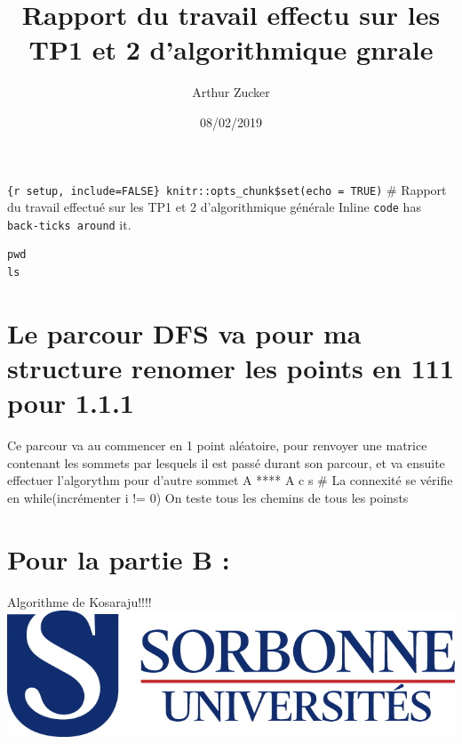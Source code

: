 \documentclass[]{article}
\title{Rapport du travail effectu sur les TP1 et 2 d'algorithmique gnrale}
\author{Arthur Zucker}
\date{08/02/2019}
\begin{document}
\maketitle

\texttt{\{r\ setup,\ include=FALSE\}\ knitr::opts\_chunk\$set(echo\ =\ TRUE)}
\# Rapport du travail effectué sur les TP1 et 2 d'algorithmique générale
Inline \texttt{code} has \texttt{back-ticks\ around} it.

\begin{verbatim}
pwd
ls
\end{verbatim}

\hypertarget{le-parcour-dfs-va-pour-ma-structure-renomer-les-points-en-111-pour-1.1.1}{%
\section{Le parcour DFS va pour ma structure renomer les points en 111
pour
1.1.1}\label{le-parcour-dfs-va-pour-ma-structure-renomer-les-points-en-111-pour-1.1.1}}

Ce parcour va au commencer en 1 point aléatoire, pour renvoyer une
matrice contenant les sommets par lesquels il est passé durant son
parcour, et va ensuite effectuer l'algorythm pour d'autre sommet A
\textbar{} **** \textbar{} A \textbar{}c \textbar{}s \# La connexité se
vérifie en while(incrémenter i != 0) On teste tous les chemins de tous
les poinsts

\hypertarget{pour-la-partie-b}{%
\section{Pour la partie B :}\label{pour-la-partie-b}}

Algorithme de Kosaraju!!!! \includegraphics{./Images/sorbonne.png}
\end{document}
